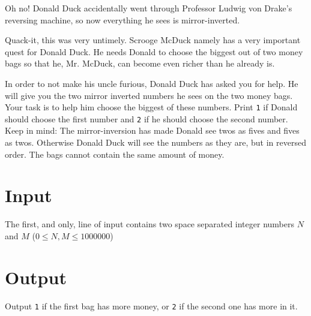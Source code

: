Oh no! Donald Duck accidentally went through Professor Ludwig von Drake’s reversing machine, so now everything he sees is mirror-inverted.

Quack-it, this was very untimely. Scrooge McDuck namely has a very important quest for Donald Duck. He needs Donald to choose the biggest out of two money bags so that he, Mr. McDuck, can become even richer than he already is.

In order to not make his uncle furious, Donald Duck has asked you for help. He will give you the two
mirror inverted numbers he sees on the two money bags. Your task is to help him choose the biggest
of these numbers. Print \texttt{1} if Donald should choose the first number and \texttt{2} if he should choose the
second number. Keep in mind: The mirror-inversion has made Donald see twos as fives and fives as twos. 
Otherwise Donald Duck will see the numbers as they are, but in reversed order. The bags cannot contain the same amount of money.

\section*{Input}
The first, and only, line of input contains two space separated integer numbers $N$ and $M$ ($0
\leq N, M \leq 1 000 000$)

\section*{Output}
Output \texttt{1} if the first bag has more money, or \texttt{2} if the second one has more in it.
